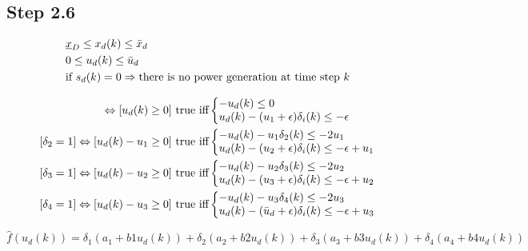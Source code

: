 \subsection*{Step 2.6}

\begin{align*}
& \underline{x}_D \leq x_d(k) \leq \Bar{x}_d \\
& 0 \leq u_d(k) \leq \Bar{u}_d \\
& \text{if } s_d(k) = 0 \Rightarrow \text{there is no power generation at time step } k 
\end{align*}

\begin{align*}
[\delta_1 = 1] \Leftrightarrow [u_d(k) \geq 0] \text{ true iff}
&\left\{\begin{matrix*}[l]
    -u_d(k) \leq 0 \\
    u_d(k) - (u_1 + \epsilon)\delta_i(k) \leq -\epsilon
\end{matrix*}\right. \\
[\delta_2 = 1] \Leftrightarrow [u_d(k)-u_1 \geq 0] \text{ true iff}
&\left\{\begin{matrix*}[l]
    -u_d(k) -u_1\delta_2(k) \leq -2u_1 \\
    u_d(k) - (u_2 + \epsilon)\delta_i(k) \leq -\epsilon + u_1
\end{matrix*}\right. \\
[\delta_3 = 1] \Leftrightarrow [u_d(k)-u_2 \geq 0] \text{ true iff}
&\left\{\begin{matrix*}[l]
    -u_d(k) -u_2\delta_3(k) \leq -2u_2 \\
    u_d(k) - (u_3 + \epsilon)\delta_i(k) \leq -\epsilon + u_2
\end{matrix*}\right. \\
[\delta_4 = 1] \Leftrightarrow [u_d(k)-u_3 \geq 0] \text{ true iff}
&\left\{\begin{matrix*}[l]
    -u_d(k) -u_3\delta_4(k) \leq -2u_3 \\
    u_d(k) - (\Bar{u}_d + \epsilon)\delta_i(k) \leq -\epsilon + u_3
\end{matrix*}\right.
\end{align*}

$$
\hat{f}(u_d(k)) = \delta_1(a_1+b1u_d(k)) + \delta_2(a_2+b2u_d(k)) + \delta_3(a_3+b3u_d(k)) + \delta_4(a_4+b4u_d(k)) 
$$



